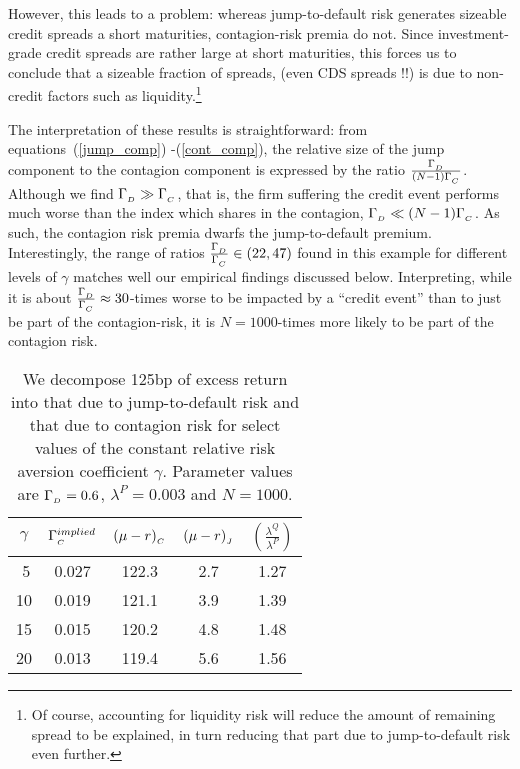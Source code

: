 \documentclass[titlepage,11pt]{article}
\begin{document}
However, this leads to a problem: whereas jump-to-default risk generates
sizeable credit spreads a short maturities, contagion-risk premia do not.
Since investment-grade credit spreads are rather large at short maturities, this forces
us to conclude that a sizeable fraction of spreads, (even CDS spreads !!) is due to non-credit
factors such as liquidity.\footnote{Of course, accounting for liquidity risk will reduce the amount of
remaining spread to be explained, in turn reducing that part due to jump-to-default risk even
further.}

The interpretation of these results is straightforward:  from equations~(\ref{jump_comp})
-(\ref{cont_comp}), the relative size of the jump component to the contagion component
is expressed by the ratio $\frac{\Gamma_{_{{D}}}}{(N-1) \Gamma_{_{{C}}}}$.  Although we find
$\Gamma_{_{{D}}} \gg \Gamma_{_{{C}}}$, that is, the firm suffering the credit event performs
much worse than the index which shares in the contagion, $\Gamma_{_{{D}}} \ll (N-1) \Gamma_{_{{C}}}$.
As such, the contagion risk premia dwarfs the jump-to-default premium.  Interestingly, the range
of ratios $\frac{\Gamma_{_{{D}}}}{\Gamma_{_{{C}}}} \in (22, 47)$ found in this example for different levels
of $\gamma$ matches well our empirical findings discussed below.
Interpreting, while it is about $\frac{\Gamma_{_{{D}}}}{\Gamma_{_{{C}}}} \approx 30$-times worse
to be impacted by a ``credit event'' than to just be part of the contagion-risk, it is
$N = 1000$-times more likely to be part of the contagion risk.

\begin{table}\footnotesize \renewcommand{\baselinestretch}{0.8}
\begin{center}
\begin{tabular}{ccccc}\hline
$\gamma$    &   $\Gamma^{implied}_{_{{C}}}$   & $(\mu - r)_{_{{C}}}$  &
$(\mu - r)_{_{{J}}}$   &   $\left( \frac{\lambda^{Q}}{\lambda^{P}} \right)$    \\ \hline
$\;$5   &   0.027   &  122.3   &   2.7 &   1.27    \\
10  &   0.019   &  121.1   &   3.9 &   1.39    \\
15  &   0.015   &  120.2   &   4.8 &   1.48    \\
20  &   0.013   &  119.4   &   5.6 &   1.56    \\ \hline
\end{tabular}
\end{center}
\caption{\footnotesize  We decompose 125bp of excess return into that due to jump-to-default
risk and that due to contagion risk for select values of the constant relative risk aversion
coefficient $\gamma$.  Parameter values are $\Gamma_{_{{D}}} = 0.6$,
$\lambda^{P} = 0.003$ and $N = 1000$. }
\end{table}
\end{document}
